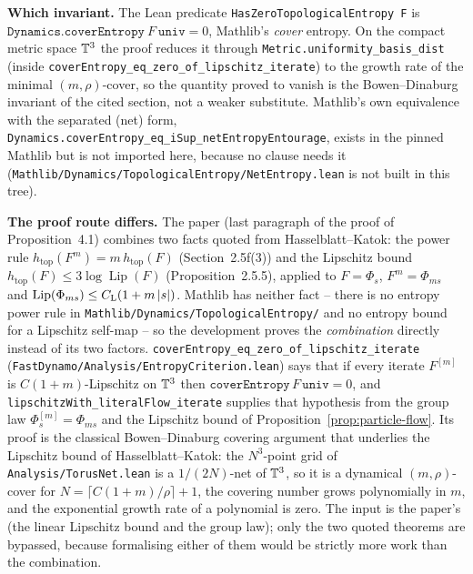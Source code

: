 \textbf{Which invariant.}  The Lean predicate \texttt{HasZeroTopologicalEntropy F} is
$\texttt{Dynamics.coverEntropy}\ F\ \texttt{univ}=0$, Mathlib's \emph{cover} entropy.  On
the compact metric space $\mathbb{T}^3$ the proof reduces it through
\texttt{Metric.uniformity\_basis\_dist} (inside
\texttt{coverEntropy\_eq\_zero\_of\_lipschitz\_iterate}) to the growth rate of the minimal
$(m,\rho)$-cover, so the quantity proved to vanish is the Bowen--Dinaburg invariant of the
cited section, not a weaker substitute.  Mathlib's own equivalence with the separated (net)
form, \texttt{Dynamics.coverEntropy\_eq\_iSup\_netEntropyEntourage}, exists in the
pinned Mathlib but is not imported here, because no clause needs it
(\texttt{Mathlib/Dynamics/TopologicalEntropy/NetEntropy.lean} is not built in this tree).

\textbf{The proof route differs.}  The paper (last paragraph of the proof of
Proposition~4.1) combines two facts quoted
from Hasselblatt--Katok: the power rule $h_{\mathrm{top}}(F^m)=m\,h_{\mathrm{top}}(F)$
(Section~2.5f(3)) and the Lipschitz bound
$h_{\mathrm{top}}(F)\leq3\log\operatorname{Lip}(F)$ (Proposition~2.5.5), applied to
$F=\Phi_s$, $F^m=\Phi_{ms}$ and $\operatorname{Lip}(\Phi_{ms})\leq C_{\rm L}(1+m\left\lvert s\right\rvert)$.
Mathlib has neither fact -- there is no entropy power rule in
\texttt{Mathlib/Dynamics/TopologicalEntropy/} and no entropy bound for a Lipschitz self-map
-- so the development proves the \emph{combination} directly instead of its two factors.
\texttt{coverEntropy\_eq\_zero\_of\_lipschitz\_iterate}
(\texttt{FastDynamo/Analysis/EntropyCriterion.lean}) says that if every iterate $F^{[m]}$ is
$C(1+m)$-Lipschitz on $\mathbb{T}^3$ then $\texttt{coverEntropy}\,F\,\texttt{univ}=0$, and
\texttt{lipschitzWith\_literalFlow\_iterate} supplies that hypothesis from the group law
$\Phi_s^{[m]}=\Phi_{ms}$ and the Lipschitz bound of
Proposition~\ref{prop:particle-flow}.  Its proof is the classical Bowen--Dinaburg covering
argument that underlies the Lipschitz bound of Hasselblatt--Katok:
the $N^3$-point grid of \texttt{Analysis/TorusNet.lean} is a $1/(2N)$-net of $\mathbb{T}^3$, so it
is a dynamical $(m,\rho)$-cover for $N=\lceil C(1+m)/\rho\rceil+1$, the covering number
grows polynomially in $m$, and the exponential growth rate of a polynomial is zero.  The
input is the paper's (the linear Lipschitz bound and the group law); only the two quoted
theorems are bypassed, because formalising either of them would be strictly more work than
the combination.

